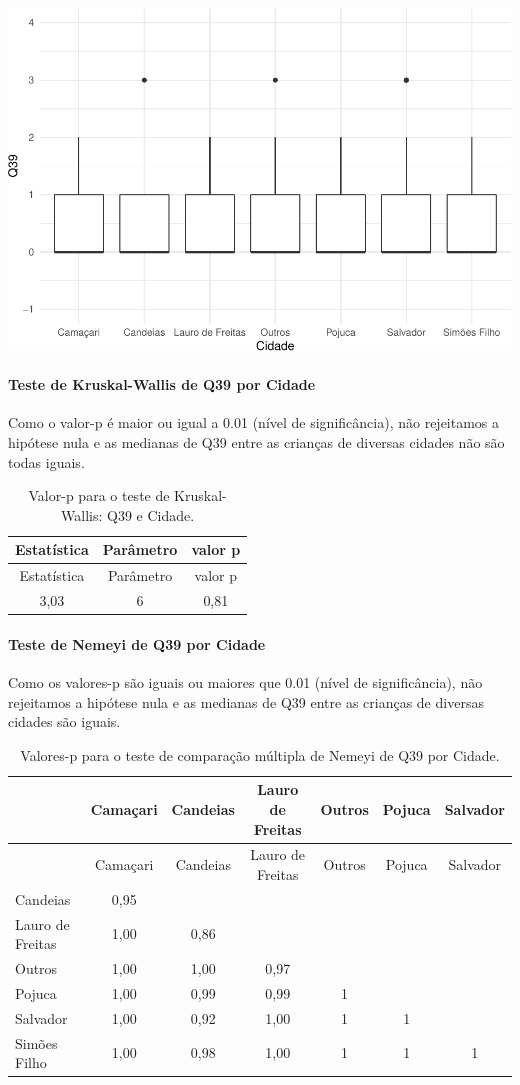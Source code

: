 \documentclass[]{article}
\let\oldparagraph\paragraph
\renewcommand{\paragraph}[1]{\oldparagraph{#1}\mbox{}}
\begin{document}
\begin{center}\includegraphics[width=0.75\linewidth]{relatorio_covid19_files/figure-latex/unnamed-chunk-1492-1} \end{center}

\hypertarget{teste-de-kruskal-wallis-de-q39-por-cidade}{%
\paragraph{Teste de Kruskal-Wallis de Q39 por Cidade}\label{teste-de-kruskal-wallis-de-q39-por-cidade}}

Como o valor-p é maior ou igual a 0.01 (nível de significância), não rejeitamos a hipótese nula e as medianas de Q39 entre as crianças de diversas cidades não são todas iguais.

\begin{longtable}[]{@{}ccc@{}}
\caption{\label{tab:unnamed-chunk-1494}Valor-p para o teste de Kruskal-Wallis: Q39 e Cidade.}\tabularnewline
\toprule
Estatística & Parâmetro & valor p\tabularnewline
\midrule
\endfirsthead
\toprule
Estatística & Parâmetro & valor p\tabularnewline
\midrule
\endhead
3,03 & 6 & 0,81\tabularnewline
\bottomrule
\end{longtable}

\hypertarget{teste-de-nemeyi-de-q39-por-cidade}{%
\paragraph{Teste de Nemeyi de Q39 por Cidade}\label{teste-de-nemeyi-de-q39-por-cidade}}

Como os valores-p são iguais ou maiores que 0.01 (nível de significância), não rejeitamos a hipótese nula e as medianas de Q39 entre as crianças de diversas cidades são iguais.

\begin{longtable}[]{@{}lcccccc@{}}
\caption{\label{tab:unnamed-chunk-1496}Valores-p para o teste de comparação múltipla de Nemeyi de Q39 por Cidade.}\tabularnewline
\toprule
& Camaçari & Candeias & Lauro de Freitas & Outros & Pojuca & Salvador\tabularnewline
\midrule
\endfirsthead
\toprule
& Camaçari & Candeias & Lauro de Freitas & Outros & Pojuca & Salvador\tabularnewline
\midrule
\endhead
Candeias & 0,95 & & & & &\tabularnewline
Lauro de Freitas & 1,00 & 0,86 & & & &\tabularnewline
Outros & 1,00 & 1,00 & 0,97 & & &\tabularnewline
Pojuca & 1,00 & 0,99 & 0,99 & 1 & &\tabularnewline
Salvador & 1,00 & 0,92 & 1,00 & 1 & 1 &\tabularnewline
Simões Filho & 1,00 & 0,98 & 1,00 & 1 & 1 & 1\tabularnewline
\bottomrule
\end{longtable}
\end{document}
